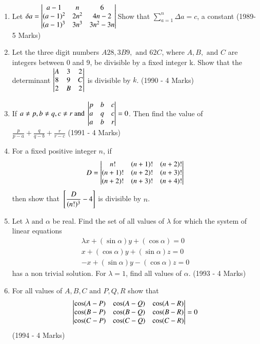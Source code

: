 \documentclass[journal,12pt,twocolumn]{IEEEtran}
\theoremstyle{remark}
\begin{document}
\begin{enumerate}
\item Let $\delta a=\begin{vmatrix}a-1&n&6\\(a-1)^2&2n^2&4n-2\\(a-1)^3&3n^3&3n^2-3n\end{vmatrix}\\$Show that $\displaystyle\sum_{a=1}^{n}\Delta a=c$, a constant \hfill (1989-5 Marks)\\[2pt]

\item Let the three digit numbers $A28, 3B9,\text{ and }62C$, where $A, B, \text{ and }C$ are integers between 0 and 9, be divisible by a fixed integer k. Show that the determinant $\begin{vmatrix}A&3&2\\8&9&C\\2&B&2\end{vmatrix}$ is divisible by $k$. \hfill (1990 - 4 Marks)\\[2pt]

\item If $a\neq p, b\neq q, c\neq r\text{ and }\begin{vmatrix}p&b&c\\a&q&c\\a&b&r\end{vmatrix}=0$. Then find the value of $\displaystyle\frac{p}{p-a}+\frac{q}{q-b}+\frac{r}{r-c}$ \hfill (1991 - 4 Marks)\\[2pt]

\item For a fixed positive integer $n$, if $$D=\begin{vmatrix}n!&(n+1)!&(n+2)!\\(n+1)!&(n+2)!&(n+3)!\\(n+2)!&(n+3)!&(n+4)!\end{vmatrix}$$ then show that $\displaystyle{}\left[\frac{D}{(n!)^3}-4\right]$ is divisible by $n$.\\[2pt]

\item Let $\lambda\text{ and }\alpha$ be real. Find the set of all values of $\lambda$ for which the system of linear equations \begin{align*}\lambda x+(\sin\alpha)y+(\cos\alpha)=0\\ x+(\cos\alpha)y+(\sin\alpha)z=0\\-x+(\sin\alpha)y-(\cos\alpha)z=0\end{align*} has a non trivial solution. For $\lambda = 1$, find all values of $\alpha$. \hfill (1993 - 4 Marks)\\[2pt]

\item For all values of $A,B,C\text{ and }P,Q,R$ show that $$\begin{vmatrix}\cos(A-P)&\cos(A-Q)&\cos(A-R)\\\cos(B-P)&\cos(B-Q)&\cos(B-R)\\\cos(C-P)&\cos(C-Q)&\cos(C-R)\end{vmatrix}=0$$ \hfill (1994 - 4 Marks)\\[2pt]
\end{enumerate}
\end{document}
